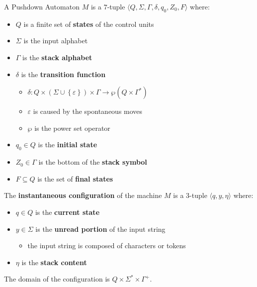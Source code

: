 \documentclass[english]{article}
\begin{document}
\begin{definition}
  \label{def:pushdown-automaton}
  A Pushdown Automaton \(M\) is a \(7\)-tuple \(\langle Q, \Sigma, \Gamma, \delta, q_0, Z_0, F \rangle\) where:

  \begin{itemize}
    \item \(Q\) is a finite set of \textbf{states} of the control units
    \item \(\Sigma\) is the input alphabet
    \item \(\Gamma\) is the \textbf{stack alphabet}
    \item \(\delta\) is the \textbf{transition function}
          \begin{itemize}
            \item \(\delta: Q \times \left( \Sigma \cup \left\{ \varepsilon \right\} \right) \times \Gamma \rightarrow \wp \left( Q \times \Gamma^\ast \right)\)
            \item \(\varepsilon\) is caused by the spontaneous moves
            \item \(\wp\) is the power set operator
          \end{itemize}
    \item \(q_0 \in Q\) is the \textbf{initial state}
    \item \(Z_0 \in \Gamma\) is the bottom of the \textbf{stack symbol}
    \item \(F \subseteq Q\) is the set of \textbf{final states}
  \end{itemize}
\end{definition}

\begin{definition}
  The \textbf{instantaneous configuration} of the machine \(M\) is a \(3\)-tuple \(\langle q, y, \eta \rangle\) where:

  \begin{itemize}
    \item \(q \in Q\) is the \textbf{current state}
    \item \(y \in \Sigma\) is the \textbf{unread portion} of the input string
          \begin{itemize}
            \item the input string is composed of characters or tokens
          \end{itemize}
    \item \(\eta\) is the \textbf{stack content}
  \end{itemize}

  The domain of the configuration is \(Q \times \Sigma^\ast \times \Gamma^+\).
\end{definition}
\end{document}
